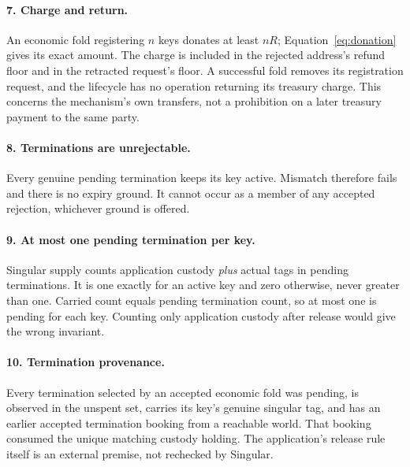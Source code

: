 \paragraph{7. Charge and return.}
\checked An economic fold registering $n$ keys donates at least $nR$;
Equation~\eqref{eq:donation} gives its exact amount. The charge is included in
the rejected address's refund floor and in the retracted request's floor.
\hand A successful fold removes its registration request, and the lifecycle
has no operation returning its treasury charge. This concerns the mechanism's
own transfers, not a prohibition on a later treasury payment to the same party.

\paragraph{8. Terminations are unrejectable.}
\checked Every genuine pending termination keeps its key active. Mismatch
therefore fails and there is no expiry ground. It cannot occur as a member of
any accepted rejection, whichever ground is offered.

\paragraph{9. At most one pending termination per key.}
\checked Singular supply counts application custody \emph{plus} actual tags
in pending terminations. It is one exactly for an active key and zero otherwise,
never greater than one. Carried count equals pending termination count, so at
most one is pending for each key.
Counting only application custody after release would give the wrong invariant.

\paragraph{10. Termination provenance.}
\checked Every termination selected by an accepted economic fold was pending,
is observed in the unspent set, carries its key's genuine singular tag, and
has an earlier accepted termination booking from a reachable world. That
booking consumed the unique matching custody holding. The application's
release rule itself is an external premise, not rechecked by Singular.


